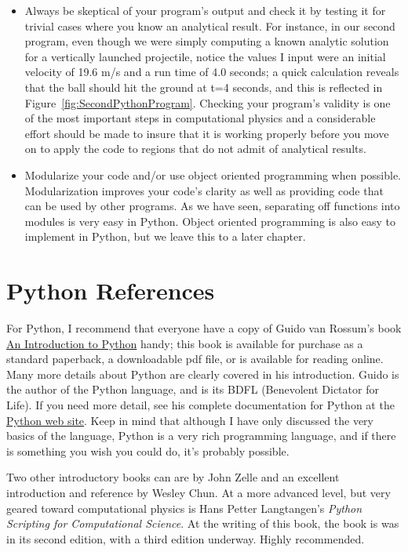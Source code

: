 \begin{itemize}
	\item Always be skeptical of your program's output and check it by testing it for trivial cases where you know an analytical result. For instance, in our second program, even though we were simply computing a known analytic solution for a vertically launched projectile, notice the values I input were an initial velocity of 19.6 m/s and a run time of 4.0 seconds; a quick calculation reveals that the ball should hit the ground at t=4 seconds, and this is reflected in Figure~\ref{fig:SecondPythonProgram}. Checking your program's validity is one of the most important steps in computational physics and a considerable effort should be made to insure that it is working properly before you move on to apply the code to regions that do not admit of analytical results. 
	
	\item Modularize your code and/or use object oriented programming when possible. Modularization improves your code's clarity as well as providing code that can be used by other programs. As we have seen, separating off functions into modules is very easy in Python. Object oriented programming is also easy to implement in Python, but we leave this to a later chapter. 	

\end{itemize}

\section{Python References}
\label{sec-references}
For Python, I recommend that everyone have a copy of Guido van Rossum's book\cite{guido-introduction} \href{http://www.network-theory.co.uk/docs/pytut/}{An Introduction to Python} handy; this book is available for purchase as a standard paperback, a downloadable pdf file, or is available for reading online. Many more details about Python are clearly covered in his introduction. Guido is the author of the Python language, and is its BDFL (Benevolent Dictator for Life). If you need more detail, see his complete documentation for Python at the \href{http://www.python.org/doc/}{Python web site}. Keep in mind that although I have only discussed the very basics of the language, Python is a very rich programming language, and if there is something you wish you could do, it's probably possible. 

Two other introductory books can are by John Zelle\cite{zelle} and an excellent introduction and reference by Wesley Chun\cite{chun2007}. At a more advanced level, but very geared toward computational physics is Hans Petter Langtangen's \textit{Python Scripting for Computational Science}\cite{langtangen-3ed}. At the writing of this book, the book is was in its second edition, with a third edition underway. Highly recommended.



